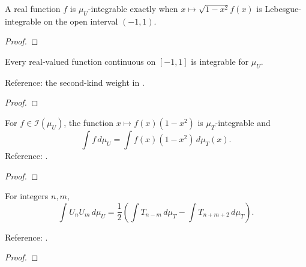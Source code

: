 \begin{supporting}

\begin{theorem}
\label{thm:measureU-integrability}
\leanok
A real function $f$ is $\mu_U$-integrable exactly when $x\mapsto\sqrt{1-x^2}f(x)$ is Lebesgue-integrable on the open interval $(-1,1)$.
\end{theorem}
\begin{proof}
\leanok
\end{proof}

\begin{lemma}[Integrability]
\label{lem:U-integrable}
\leanok
{}
Every real-valued function continuous on $[-1,1]$ is integrable for $\mu_U$.

Reference: the second-kind weight in \cite[Table 18.3.1]{dlmf}.
\end{lemma}
\begin{proof}
\leanok
\end{proof}

\begin{lemma}
\label{lem:U-to-T}
\leanok
For $f\in\mathcal I(\mu_U)$, the function $x\mapsto f(x)(1-x^2)$ is $\mu_T$-integrable and
\[\int f\,d\mu_U=\int f(x)(1-x^2)\,d\mu_T(x).\]
Reference: \cite[Table 18.3.1]{dlmf}.
\end{lemma}
\begin{proof}
\leanok
\end{proof}

\begin{lemma}
\label{lem:U-product}
\leanok

For integers $n,m$,
\[\int U_n U_m\,d\mu_U=\frac12\left(\int T_{n-m}\,d\mu_T
-\int T_{n+m+2}\,d\mu_T\right).\]

Reference: \cite[Table 18.3.1 and equations 18.5.1--18.5.2]{dlmf}.
\end{lemma}
\begin{proof}
\leanok
\end{proof}

\end{supporting}


